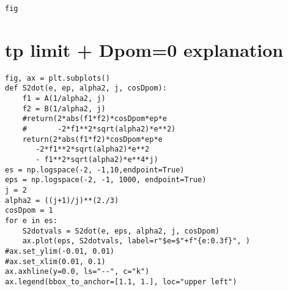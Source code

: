 \documentclass[11pt]{article}
\begin{document}
\begin{verbatim}
fig
\end{verbatim}

\section{tp limit + Dpom=0 explanation}
\label{sec:orgdbf53d8}
\begin{verbatim}
fig, ax = plt.subplots()
def S2dot(e, ep, alpha2, j, cosDpom):
    f1 = A(1/alpha2, j)
    f2 = B(1/alpha2, j)
    #return(2*abs(f1*f2)*cosDpom*ep*e
    #       -2*f1**2*sqrt(alpha2)*e**2)
    return(2*abs(f1*f2)*cosDpom*ep*e
	   -2*f1**2*sqrt(alpha2)*e**2
	   - f1**2*sqrt(alpha2)*e**4*j)
es = np.logspace(-2, -1,10,endpoint=True)
eps = np.logspace(-2, -1, 1000, endpoint=True)
j = 2
alpha2 = ((j+1)/j)**(2./3)
cosDpom = 1
for e in es:
    S2dotvals = S2dot(e, eps, alpha2, j, cosDpom)
    ax.plot(eps, S2dotvals, label=r"$e=$"+f"{e:0.3f}", )
#ax.set_ylim(-0.01, 0.01)
#ax.set_xlim(0.01, 0.1)
ax.axhline(y=0.0, ls="--", c="k")
ax.legend(bbox_to_anchor=[1.1, 1.], loc="upper left")
\end{verbatim}
\end{document}
